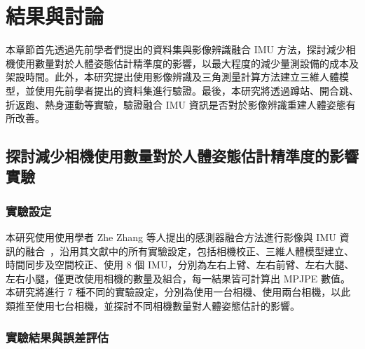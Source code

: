 \chapter{結果與討論}
\fontsize{12pt}{18pt}\selectfont %

本章節首先透過先前學者們提出的資料集與影像辨識融合 IMU 方法，探討減少相機使用數量對於人體姿態估計精準度的影響，以最大程度的減少量測設備的成本及架設時間。此外，本研究提出使用影像辨識及三角測量計算方法建立三維人體模型，並使用先前學者提出的資料集進行驗證。最後，本研究將透過蹲站、開合跳、折返跑、熱身運動等實驗，驗證融合 IMU 資訊是否對於影像辨識重建人體姿態有所改善。

\section{探討減少相機使用數量對於人體姿態估計精準度的影響實驗}\label{ch4_sec_cameraset}
\subsection{實驗設定}
本研究使用使用學者 Zhe Zhang 等人提出的感測器融合方法進行影像與 IMU 資訊的融合~\cite{Zhang_2020_CVPR}，沿用其文獻中的所有實驗設定，包括相機校正、三維人體模型建立、時間同步及空間校正、使用 8 個 IMU，分別為左右上臂、左右前臂、左右大腿、左右小腿，僅更改使用相機的數量及組合，每一結果皆可計算出 MPJPE 數值。本研究將進行 7 種不同的實驗設定，分別為使用一台相機、使用兩台相機，以此類推至使用七台相機，並探討不同相機數量對人體姿態估計的影響。

\clearpage

\subsection{實驗結果與誤差評估}
